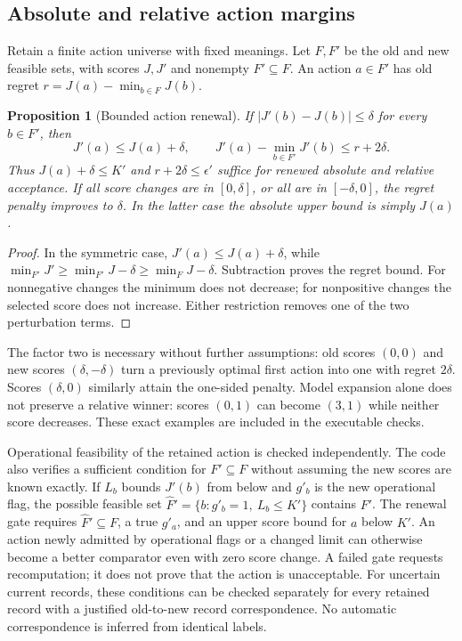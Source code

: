 \documentclass[11pt,a4paper]{article}
\newtheorem{proposition}[theorem]{Proposition}
\theoremstyle{definition}\newtheorem{definition}[theorem]{Definition}
\begin{document}
\subsection{Absolute and relative action margins}
Retain a finite action universe with fixed meanings. Let $F,F'$ be the old and
new feasible sets, with scores $J,J'$ and nonempty $F'\subseteq F$. An action
$a\in F'$ has old regret $r=J(a)-\min_{b\in F}J(b)$.

\begin{proposition}[Bounded action renewal]\label{prop:actionrenewal}
If $|J'(b)-J(b)|\le\delta$ for every $b\in F'$, then
\[
 J'(a)\le J(a)+\delta,\qquad
 J'(a)-\min_{b\in F'}J'(b)\le r+2\delta.
\]
Thus $J(a)+\delta\le K'$ and $r+2\delta\le\epsilon'$ suffice for renewed absolute
and relative acceptance. If all score changes are in $[0,\delta]$, or all are in
$[-\delta,0]$, the regret penalty improves to $\delta$. In the latter case the
absolute upper bound is simply $J(a)$.
\end{proposition}
\begin{proof}
In the symmetric case, $J'(a)\le J(a)+\delta$, while
$\min_{F'}J'\ge\min_{F'}J-\delta\ge\min_FJ-\delta$. Subtraction proves the
regret bound. For nonnegative changes the minimum does not decrease; for
nonpositive changes the selected score does not increase. Either restriction
removes one of the two perturbation terms.
\end{proof}

The factor two is necessary without further assumptions: old scores $(0,0)$
and new scores $(\delta,-\delta)$ turn a previously optimal first action into
one with regret $2\delta$. Scores $(\delta,0)$ similarly attain the one-sided
penalty. Model expansion alone does not preserve a relative winner: scores
$(0,1)$ can become $(3,1)$ while neither score decreases. These exact examples
are included in the executable checks.

Operational feasibility of the retained action is checked independently. The
code also verifies a sufficient condition for $F'\subseteq F$ without assuming
the new scores are known exactly. If $L_b$ bounds $J'(b)$ from below and $g'_b$
is the new operational flag, the possible feasible set
$\widehat F'=\{b:g'_b=1,\ L_b\le K'\}$ contains $F'$. The renewal gate requires
$\widehat F'\subseteq F$, a true $g'_a$, and an upper score bound for $a$ below
$K'$. An action newly admitted by operational flags or a changed limit can
otherwise become a better comparator even with zero score change. A failed
gate requests recomputation; it does not prove that the action is unacceptable.
For uncertain current records, these conditions can be checked separately for
every retained record with a justified old-to-new record correspondence. No
automatic correspondence is inferred from identical labels.
\end{document}
